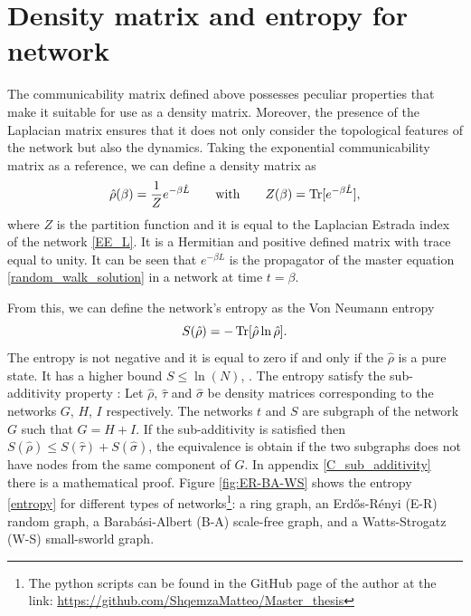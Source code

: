 \section{Density matrix and entropy for network}
The communicability matrix defined above possesses peculiar properties that make it suitable for use as a density matrix. Moreover, the presence of the Laplacian matrix ensures that it does not only consider the topological features of the network but also the dynamics. Taking the exponential communicability matrix as a reference, we can define a density matrix as
\begin{equation}\label{density_matrix}
    \hat \rho(\beta) = \frac{1}{Z} e^{-\beta \hat L} \qquad \mathrm{with} \qquad Z(\beta) = \operatorname{Tr}[e^{-\beta \hat L}],
\end{equation}
where $Z$ is the partition function and it is equal to the Laplacian Estrada index of the network \eqref{EE_L}.
It is a Hermitian and positive defined matrix with trace equal to unity. 
It can be seen that $e^{-\beta L}$ is the propagator of the master equation \eqref{random_walk_solution} in a network at time $t = \beta$.

From this, we can define the network's entropy as the Von Neumann entropy
\begin{equation} \label{entropy}
    S(\hat\rho) = -\operatorname{Tr}[\hat \rho \ln \hat \rho].
\end{equation}
The entropy is not negative and it is equal to zero if and only if the $\hat\rho$ is a pure state. It has a higher bound $S \leq \ln(N)$,  \cite{Nielsen_Chuang_2010}.
The entropy satisfy the sub-additivity property \cite{De_Domenico_2016}:
Let $\hat\rho$, $\hat\tau$ and $\hat\sigma$ be density matrices corresponding to the networks $G$, $H$, $I$ respectively. The networks $t$ and $S$ are subgraph of the network $G$ such that $G = H + I$.
If the sub-additivity is satisfied  then $S(\hat\rho) \leq S(\hat\tau) + S(\hat\sigma)$, the equivalence is obtain if the two subgraphs does not have nodes from the same component of $G$. In appendix \ref{C_sub_additivity} there is a mathematical proof.
Figure \ref{fig:ER-BA-WS} shows the entropy \eqref{entropy} for different types of networks\footnote{The python scripts can be found in the GitHub page of the author at the link: \url{https://github.com/ShqemzaMatteo/Master_thesis}}: a ring graph, an Erd\H{o}s-Rényi (E-R) random graph, a Barab\'asi-Albert (B-A) scale-free graph, and a Watts-Strogatz (W-S) small-sworld graph.

